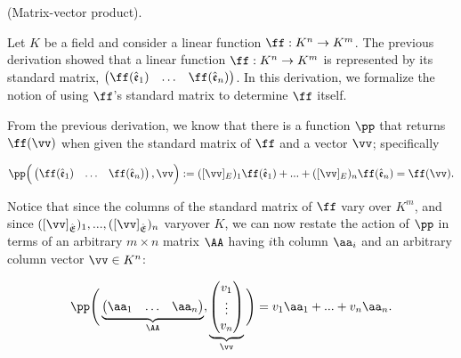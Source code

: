 \begin{deriv}
    (Matrix-vector product).
    
    Let $K$ be a field and consider a linear function $\ff:K^n \rightarrow K^m$. The previous derivation showed that a linear function $\ff:K^n \rightarrow K^m$ is represented by its standard matrix, $\begin{pmatrix} \ff(\see_1) & \hdots & \ff(\see_n) \end{pmatrix}$. In this derivation, we formalize the notion of using $\ff$'s standard matrix to determine $\ff$ itself.
    
    From the previous derivation, we know that there is a function $\pp$ that returns $\ff(\vv)$ when given the standard matrix of $\ff$ and a vector $\vv$; specifically
    
    \begin{align*}
        \pp\Big( \begin{pmatrix} \ff(\see_1) & \hdots & \ff(\see_n) \end{pmatrix}, \vv \Big) := ([\vv]_E)_1 \ff(\see_1) + ... + ([\vv]_E)_n \ff(\see_n) = \ff(\vv).
    \end{align*}
    
    Notice that since the columns of the standard matrix of $\ff$ vary over $K^m$, and since $([\vv]_\sE)_1, ..., ([\vv]_\sE)_n$ vary\footnotemark over $K$, we can now restate the action of $\pp$ in terms of an arbitrary $m \times n$ matrix $\AA$ having $i$th column $\aa_i$ and an arbitrary column vector $\vv \in K^n$:
    
    
    \begin{align*}
        \pp\Bigg(
            \underbrace
            {\begin{pmatrix} 
                \aa_1 & \hdots & \aa_n
            \end{pmatrix}}_\AA,
            \underbrace{
            \begin{pmatrix} 
                v_1 \\ \vdots \\ v_n 
            \end{pmatrix}}_\vv
            \Bigg)
            =
            v_1 \aa_1 + ... + v_n \aa_n.
    \end{align*}
    

\end{deriv}
